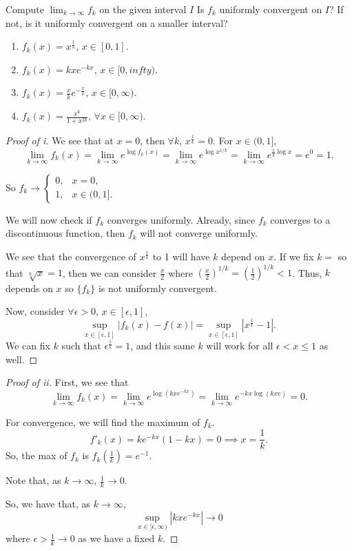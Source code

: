 \documentclass[../hw3]{subfiles}
\begin{document}
\begin{problem}
Compute $\lim_{k \to \infty} f_k$ on the given interval $I$
Is $f_k$ uniformly convergent on  $I$?
If not, is it uniformly convergent on a smaller interval?
\begin{enumerate}[label=\roman*)]
	\item $f_k(x)=x^{\frac{1}{k}},\, x \in [0,1]$.
	\item $f_k(x)=kxe^{-kx},\, x \in [0,infty)$.
	\item $f_k(x)=\frac{x}{k}e^{-\frac{x}{k}},\, x \in [0,\infty)$.
	\item $f_k(x)=\frac{x^k}{1+x^{2k}},\, \forall x \in [0,\infty)$.
\end{enumerate}
\end{problem}
\begin{proof}[Proof of i]
	We see that at $x=0$, then  $\forall k,\, x^{\frac{1}{k}}=0$.
	For $x \in (0,1]$, \[
		\lim_{k \to \infty} f_k(x)=\lim_{k \to \infty} e^{\log{f_k(x)}}=\lim_{k \to \infty} e^{\log{x^{1 / k}} } =\lim_{k \to \infty} e^{\frac{1}{k}\log{x} }=e^0=1
		.\]

	So $f_k\to \begin{cases}
			0, & x=0, \\ 1, & x \in (0,1].
		\end{cases}$

	We will now check if $f_k$ converges uniformly.
	Already, since $f_k$ converges to a discontinuous function, then $f_k$ will not converge uniformly.

	We see that the convergence of $x^{\frac{1}{k}}$ to 1 will have $k$ depend on  $x$.
	If we fix $k=$ so that $\sqrt[k]{x} = 1$, then we can consider $\frac{x}{2}$ where ${\left( \frac{x}{2} \right)}^{1 / k} = {\left( \frac{1}{2} \right) }^{1 / k} < 1$.
	Thus, $k$ depends on $x$ so $\{ f_k \}$ is not uniformly convergent.

	Now, consider $\forall \epsilon>0,\,  x \in [\epsilon,1]$,  \[
		\sup_{x \in [\epsilon,1]}|f_k(x)-f(x)| = \sup_{x \in [\epsilon,1]}|x^{\frac{1}{k}}-1|
		.\]
	We can fix $k$ such that $\epsilon^{\frac{1}{k}}=1$, and this same $k$ will work for all  $\epsilon<x\le 1$ as well.
\end{proof}
\begin{proof}[Proof of ii]
	First, we see that \[
		\lim_{k \to \infty} f_k(x)=\lim_{k \to \infty} e^{\log{\left( kxe^{-kx} \right) } }=\lim_{k \to \infty} e^{-kx\log{(kxe)} } = 0
		.\]

	For convergence, we will find the maximum of $f_k$.
	\[
		f'_k(x)=ke^{-kx}(1-kx)=0\implies x=\frac{1}{k}
		.\]
	So, the max of $f_k$ is $f_k\left( \frac{1}{k} \right) = e^{-1}$.

	Note that, as $k\to \infty,\, \frac{1}{k}\to 0$.

	So, we have that, as $k\to \infty$, \[
		\sup_{x \in [\epsilon,\infty)} \left|kxe^{-kx}\right| \to 0
	\] where $\epsilon>\frac{1}{k}\to 0$ as we have a fixed $k$.
\end{proof}
\end{document}
